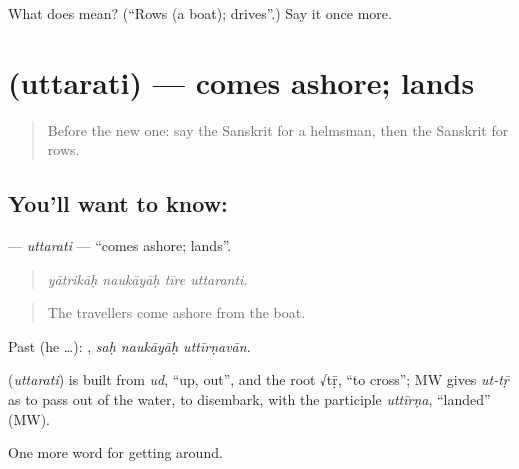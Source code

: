 \begin{tcolorbox}[breakable,colback=teal!4,colframe=teal!35!black,title={Before you move on}]
What does  mean? (\textquotedblleft{}Rows (a boat); drives\textquotedblright{}.) Say it once more.
\end{tcolorbox}
\section[\texorpdfstring{\sk{उत्तरति} (uttarati)}{उत्तरति (uttarati)}]{ (uttarati) — comes ashore; lands}

\label{lesson:SA-C416-uttarati}



\begin{quote}
Before the new one: say the Sanskrit for a helmsman, then the Sanskrit for rows.
\end{quote}

\subsection*{You'll want to know: }
\textbf{} — \emph{uttarati} — \textquotedblleft{}comes ashore; lands\textquotedblright{}.

\begin{quote}
   
\end{quote}

\begin{quote}
\emph{yātrikāḥ naukāyāḥ tīre uttaranti.}
\end{quote}

\begin{quote}
The travellers come ashore from the boat.
\end{quote}

Past (he …):   , \emph{saḥ naukāyāḥ uttīrṇavān}.

\begin{cousinweb}
\textbf{} (\emph{uttarati}) is built from \emph{ud}, \textquotedblleft{}up, out\textquotedblright{}, and the root √tṝ, \textquotedblleft{}to cross\textquotedblright{}; MW gives \emph{ut-tṝ} as to pass out of the water, to disembark, with the participle \emph{uttīrṇa}, \textquotedblleft{}landed\textquotedblright{} (MW).
\end{cousinweb}

\begin{grammarlens}[title={What you've built}]
One more word for getting around.
\end{grammarlens}

